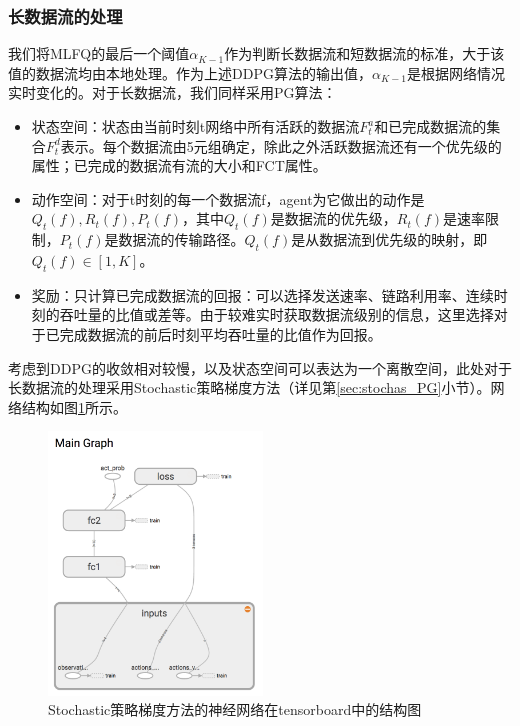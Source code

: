 \subsubsection{长数据流的处理}
我们将MLFQ的最后一个阈值$\alpha_{K-1}$作为判断长数据流和短数据流的标准，大于该值的数据流均由本地处理。作为上述DDPG算法的输出值，$\alpha_{K-1}$是根据网络情况实时变化的。对于长数据流，我们同样采用PG算法：
\begin{itemize}
    \item 状态空间：状态由当前时刻t网络中所有活跃的数据流$F_t^a$和已完成数据流的集合$F_t^d$表示。每个数据流由5元组确定，除此之外活跃数据流还有一个优先级的属性；已完成的数据流有流的大小和FCT属性。
    \item 动作空间：对于t时刻的每一个数据流f，agent为它做出的动作是${Q_{t}(f), R_{t}(f), P_{t}(f)}$，其中$Q_{t}(f)$是数据流的优先级，$R_{t}(f)$是速率限制，$P_{t}(f)$是数据流的传输路径。$Q_{t}(f)$是从数据流到优先级的映射，即$Q_{t}(f) \in [1,K]$。
    \item 奖励：只计算已完成数据流的回报：可以选择发送速率、链路利用率、连续时刻的吞吐量的比值或差等。由于较难实时获取数据流级别的信息，这里选择对于已完成数据流的前后时刻平均吞吐量的比值作为回报。
\end{itemize}
考虑到DDPG的收敛相对较慢，以及状态空间可以表达为一个离散空间，此处对于长数据流的处理采用Stochastic策略梯度方法（详见第\ref{sec:stochas_PG}小节）。网络结构如图\ref{fig:stochas_pg}所示。
\begin{figure}[ht]
\centering
\includegraphics[height=7cm]{figure/dpg.png}
\caption{Stochastic策略梯度方法的神经网络在tensorboard中的结构图}
\label{fig:stochas_pg}
\end{figure}

